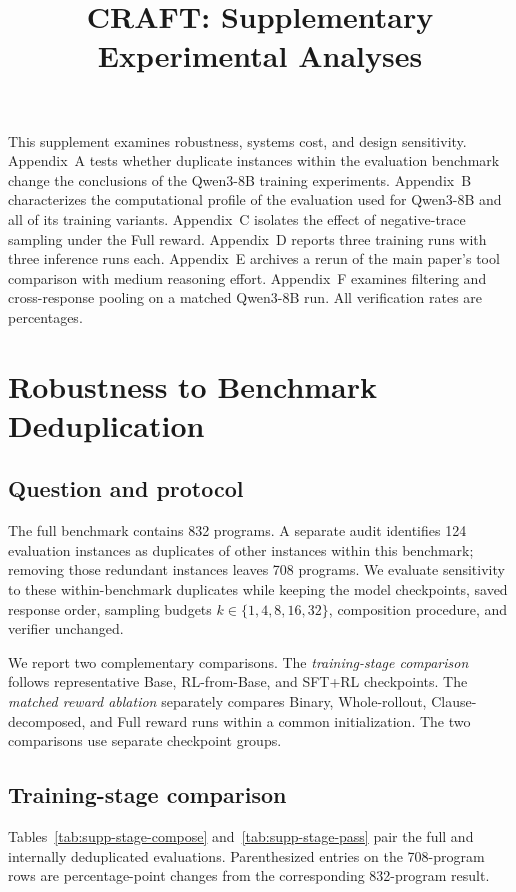 \documentclass[10pt]{article}
\title{CRAFT: Supplementary Experimental Analyses}
\author{}
\date{}
\begin{document}
\maketitle

\noindent
This supplement examines robustness, systems cost, and design sensitivity.
Appendix~A tests whether duplicate instances within the evaluation
benchmark change the conclusions of the Qwen3-8B training experiments.
Appendix~B characterizes the computational profile of the evaluation used for
Qwen3-8B and all of its training variants.  Appendix~C isolates the effect of
negative-trace sampling under the Full reward.  Appendix~D reports three
training runs with three inference runs each.  Appendix~E archives a rerun
of the main paper's tool comparison with medium reasoning effort. Appendix~F
examines filtering and cross-response pooling on a matched Qwen3-8B run. All
verification rates are percentages.

\appendix
\section{Robustness to Benchmark Deduplication}
\label{app:supp-dedup}

\subsection{Question and protocol}

The full benchmark contains 832 programs.  A separate audit identifies 124
evaluation instances as duplicates of other instances within this benchmark;
removing those redundant instances leaves 708 programs. We evaluate
sensitivity to these within-benchmark duplicates while keeping the model
checkpoints, saved response order, sampling budgets
\(k\in\{1,4,8,16,32\}\), composition procedure, and verifier unchanged.

We report two complementary comparisons.  The \emph{training-stage
comparison} follows representative Base, RL-from-Base, and SFT+RL
checkpoints.  The \emph{matched reward ablation} separately compares Binary,
Whole-rollout, Clause-decomposed, and Full reward runs within a common
initialization. The two comparisons use separate checkpoint groups.

\subsection{Training-stage comparison}

Tables~\ref{tab:supp-stage-compose} and~\ref{tab:supp-stage-pass} pair the full
and internally deduplicated evaluations.  Parenthesized entries on the 708-program rows
are percentage-point changes from the corresponding 832-program result.
\end{document}
